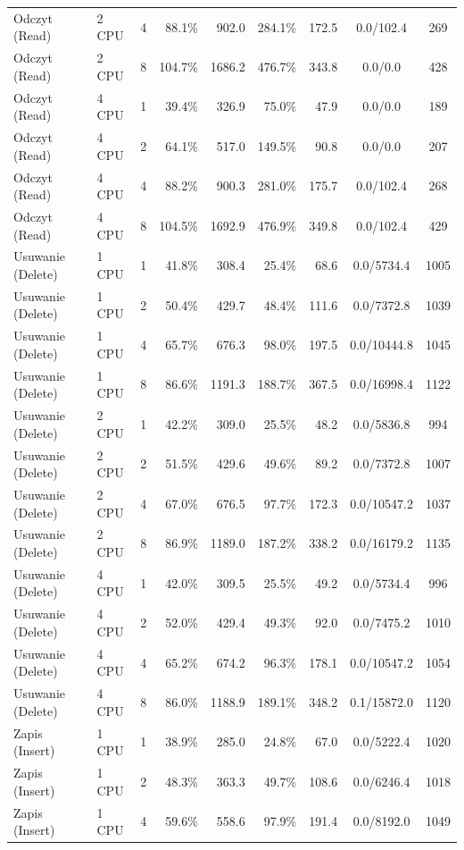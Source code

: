 \begin{table}[ht]
{\begin{tabular}{llcrrrrcc}
Odczyt (Read) & 2 CPU & 4 & 88.1\% & 902.0 & 284.1\% & 172.5 & 0.0/102.4 & 269 \\
Odczyt (Read) & 2 CPU & 8 & 104.7\% & 1686.2 & 476.7\% & 343.8 & 0.0/0.0 & 428 \\
Odczyt (Read) & 4 CPU & 1 & 39.4\% & 326.9 & 75.0\% & 47.9 & 0.0/0.0 & 189 \\
Odczyt (Read) & 4 CPU & 2 & 64.1\% & 517.0 & 149.5\% & 90.8 & 0.0/0.0 & 207 \\
Odczyt (Read) & 4 CPU & 4 & 88.2\% & 900.3 & 281.0\% & 175.7 & 0.0/102.4 & 268 \\
Odczyt (Read) & 4 CPU & 8 & 104.5\% & 1692.9 & 476.9\% & 349.8 & 0.0/102.4 & 429 \\
Usuwanie (Delete) & 1 CPU & 1 & 41.8\% & 308.4 & 25.4\% & 68.6 & 0.0/5734.4 & 1005 \\
Usuwanie (Delete) & 1 CPU & 2 & 50.4\% & 429.7 & 48.4\% & 111.6 & 0.0/7372.8 & 1039 \\
Usuwanie (Delete) & 1 CPU & 4 & 65.7\% & 676.3 & 98.0\% & 197.5 & 0.0/10444.8 & 1045 \\
Usuwanie (Delete) & 1 CPU & 8 & 86.6\% & 1191.3 & 188.7\% & 367.5 & 0.0/16998.4 & 1122 \\
Usuwanie (Delete) & 2 CPU & 1 & 42.2\% & 309.0 & 25.5\% & 48.2 & 0.0/5836.8 & 994 \\
Usuwanie (Delete) & 2 CPU & 2 & 51.5\% & 429.6 & 49.6\% & 89.2 & 0.0/7372.8 & 1007 \\
Usuwanie (Delete) & 2 CPU & 4 & 67.0\% & 676.5 & 97.7\% & 172.3 & 0.0/10547.2 & 1037 \\
Usuwanie (Delete) & 2 CPU & 8 & 86.9\% & 1189.0 & 187.2\% & 338.2 & 0.0/16179.2 & 1135 \\
Usuwanie (Delete) & 4 CPU & 1 & 42.0\% & 309.5 & 25.5\% & 49.2 & 0.0/5734.4 & 996 \\
Usuwanie (Delete) & 4 CPU & 2 & 52.0\% & 429.4 & 49.3\% & 92.0 & 0.0/7475.2 & 1010 \\
Usuwanie (Delete) & 4 CPU & 4 & 65.2\% & 674.2 & 96.3\% & 178.1 & 0.0/10547.2 & 1054 \\
Usuwanie (Delete) & 4 CPU & 8 & 86.0\% & 1188.9 & 189.1\% & 348.2 & 0.1/15872.0 & 1120 \\
Zapis (Insert) & 1 CPU & 1 & 38.9\% & 285.0 & 24.8\% & 67.0 & 0.0/5222.4 & 1020 \\
Zapis (Insert) & 1 CPU & 2 & 48.3\% & 363.3 & 49.7\% & 108.6 & 0.0/6246.4 & 1018 \\
Zapis (Insert) & 1 CPU & 4 & 59.6\% & 558.6 & 97.9\% & 191.4 & 0.0/8192.0 & 1049 \\

\end{tabular}}
\end{table}
